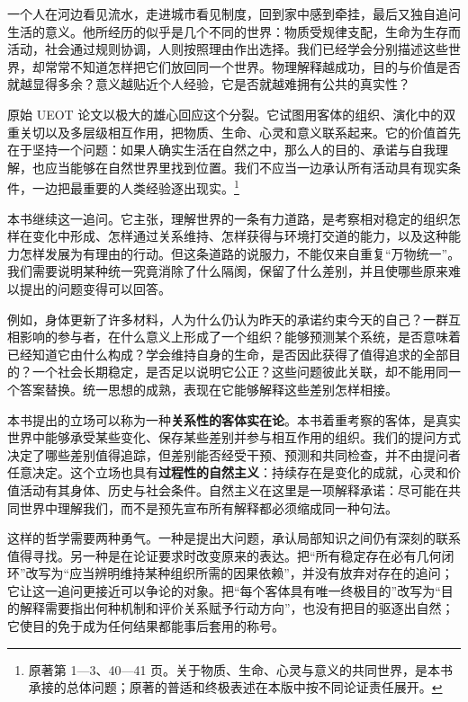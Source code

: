 \documentclass[
  11pt,
  oneside]{book}
\begin{document}
一个人在河边看见流水，走进城市看见制度，回到家中感到牵挂，最后又独自追问生活的意义。他所经历的似乎是几个不同的世界：物质受规律支配，生命为生存而活动，社会通过规则协调，人则按照理由作出选择。我们已经学会分别描述这些世界，却常常不知道怎样把它们放回同一个世界。物理解释越成功，目的与价值是否就越显得多余？意义越贴近个人经验，它是否就越难拥有公共的真实性？

原始 UEOT 论文以极大的雄心回应这个分裂。它试图用客体的组织、演化中的双重关切以及多层级相互作用，把物质、生命、心灵和意义联系起来。它的价值首先在于坚持一个问题：如果人确实生活在自然之中，那么人的目的、承诺与自我理解，也应当能够在自然世界里找到位置。我们不应当一边承认所有活动具有现实条件，一边把最重要的人类经验逐出现实。\footnote{\hypertarget{ph-note-2}{}原著第 1---3、40---41 页。关于物质、生命、心灵与意义的共同世界，是本书承接的总体问题；原著的普适和终极表述在本版中按不同论证责任展开。}

本书继续这一追问。它主张，理解世界的一条有力道路，是考察相对稳定的组织怎样在变化中形成、怎样通过关系维持、怎样获得与环境打交道的能力，以及这种能力怎样发展为有理由的行动。但这条道路的说服力，不能仅来自重复``万物统一''。我们需要说明某种统一究竟消除了什么隔阂，保留了什么差别，并且使哪些原来难以提出的问题变得可以回答。

例如，身体更新了许多材料，人为什么仍认为昨天的承诺约束今天的自己？一群互相影响的参与者，在什么意义上形成了一个组织？能够预测某个系统，是否意味着已经知道它由什么构成？学会维持自身的生命，是否因此获得了值得追求的全部目的？一个社会长期稳定，是否足以说明它公正？这些问题彼此关联，却不能用同一个答案替换。统一思想的成熟，表现在它能够解释这些差别怎样相接。

本书提出的立场可以称为一种\textbf{关系性的客体实在论}。本书着重考察的客体，是真实世界中能够承受某些变化、保存某些差别并参与相互作用的组织。我们的提问方式决定了哪些差别值得追踪，但差别能否经受干预、预测和共同检查，并不由提问者任意决定。这个立场也具有\textbf{过程性的自然主义}：持续存在是变化的成就，心灵和价值活动有其身体、历史与社会条件。自然主义在这里是一项解释承诺：尽可能在共同世界中理解我们，而不是预先宣布所有解释都必须缩成同一种句法。

这样的哲学需要两种勇气。一种是提出大问题，承认局部知识之间仍有深刻的联系值得寻找。另一种是在论证要求时改变原来的表达。把``所有稳定存在必有几何闭环''改写为``应当辨明维持某种组织所需的因果依赖''，并没有放弃对存在的追问；它让这一追问更接近可以争论的对象。把``每个客体具有唯一终极目的''改写为``目的解释需要指出何种机制和评价关系赋予行动方向''，也没有把目的驱逐出自然；它使目的免于成为任何结果都能事后套用的称号。
\end{document}
